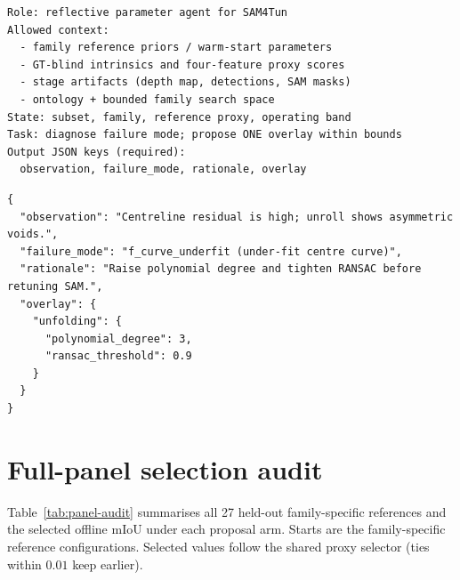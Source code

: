 \documentclass[a4paper,fleqn]{cas-dc}
\begin{document}
{\begin{lstlisting}[caption={Agent-prompt skeleton (per round).},label=lst:prompt-skeleton]
Role: reflective parameter agent for SAM4Tun
Allowed context:
  - family reference priors / warm-start parameters
  - GT-blind intrinsics and four-feature proxy scores
  - stage artifacts (depth map, detections, SAM masks)
  - ontology + bounded family search space
State: subset, family, reference proxy, operating band
Task: diagnose failure mode; propose ONE overlay within bounds
Output JSON keys (required):
  observation, failure_mode, rationale, overlay
\end{lstlisting}

\begin{lstlisting}[caption={Example JSON proposal returned by the agent.},label=lst:prompt-example]
{
  "observation": "Centreline residual is high; unroll shows asymmetric voids.",
  "failure_mode": "f_curve_underfit (under-fit centre curve)",
  "rationale": "Raise polynomial degree and tighten RANSAC before retuning SAM.",
  "overlay": {
    "unfolding": {
      "polynomial_degree": 3,
      "ransac_threshold": 0.9
    }
  }
}
\end{lstlisting}

\section{Full-panel selection audit}\label{app:poc-selection}

Table~\ref{tab:panel-audit} summarises all 27 held-out family-specific references and the selected offline mIoU under each proposal arm. Starts are the family-specific reference configurations. Selected values follow the shared proxy selector (ties within $0.01$ keep earlier).

}
\end{document}
